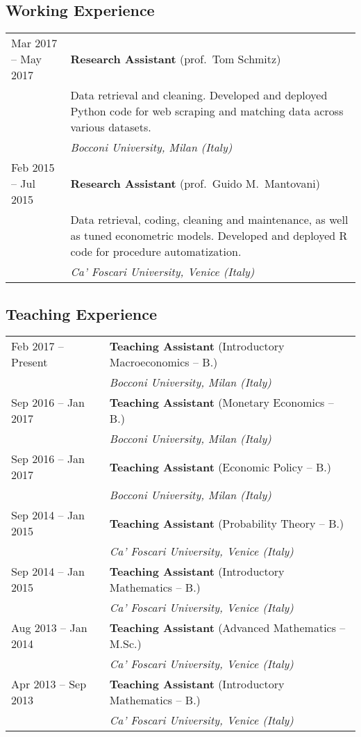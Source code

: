 \documentclass[a4paper,10pt]{article}
\newlength{\leftcolumn}
\newlength{\maincolumn}
\newcommand{\cafoscari}{\emph{Ca' Foscari University, Venice (Italy)}}
\newcommand{\bocconi}{\emph{Bocconi University, Milan (Italy)}}
\begin{document}
	\subsection*{Working Experience}
		\begin{longtable}{p{\leftcolumn}p{\maincolumn}}
			Mar 2017 -- May 2017 	& \textbf{Research Assistant} (prof.~Tom Schmitz) \\
									& Data retrieval and cleaning. Developed and deployed Python code for web scraping and matching data across various datasets. \\
									& \bocconi \vspace{1em}\\
			Feb 2015 -- Jul 2015 	& \textbf{Research Assistant} (prof.~Guido M.~Mantovani) \\
									& Data retrieval, coding, cleaning and maintenance, as well as tuned econometric models. Developed and deployed R code for procedure automatization. \\
									& \cafoscari \vspace{1em}\\
		\end{longtable}

	\subsection*{Teaching Experience}
		\begin{longtable}{p{\leftcolumn}p{\maincolumn}}
			Feb 2017 -- Present 	& \textbf{Teaching Assistant} (Introductory Macroeconomics -- B.) \\
									& \bocconi \vspace{1em}\\
			Sep 2016 -- Jan 2017 	& \textbf{Teaching Assistant} (Monetary Economics -- B.) \\
									& \bocconi \vspace{1em}\\
			Sep 2016 -- Jan 2017 	& \textbf{Teaching Assistant} (Economic Policy -- B.) \\
									& \bocconi \vspace{1em}\\
			Sep 2014 -- Jan 2015 	& \textbf{Teaching Assistant} (Probability Theory -- B.) \\
									& \cafoscari \vspace{1em}\\
			Sep 2014 -- Jan 2015 	& \textbf{Teaching Assistant} (Introductory Mathematics -- B.) \\
									& \cafoscari \vspace{1em}\\
			Aug 2013 -- Jan 2014 	& \textbf{Teaching Assistant} (Advanced Mathematics -- M.Sc.) \\
									& \cafoscari \vspace{1em}\\
			Apr 2013 -- Sep 2013 	& \textbf{Teaching Assistant} (Introductory Mathematics -- B.) \\
									& \cafoscari \vspace{1em}
		\end{longtable}
\end{document}
